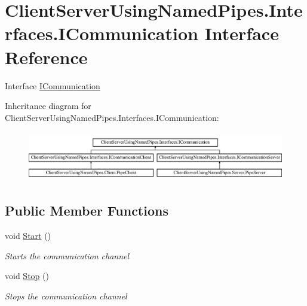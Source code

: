 \hypertarget{interface_client_server_using_named_pipes_1_1_interfaces_1_1_i_communication}{}\section{Client\+Server\+Using\+Named\+Pipes.\+Interfaces.\+I\+Communication Interface Reference}
\label{interface_client_server_using_named_pipes_1_1_interfaces_1_1_i_communication}


Interface \hyperlink{interface_client_server_using_named_pipes_1_1_interfaces_1_1_i_communication}{I\+Communication}  


Inheritance diagram for Client\+Server\+Using\+Named\+Pipes.\+Interfaces.\+I\+Communication\+:\begin{figure}[H]
\begin{center}
\leavevmode
\includegraphics[height=2.193212cm]{interface_client_server_using_named_pipes_1_1_interfaces_1_1_i_communication}
\end{center}
\end{figure}
\subsection*{Public Member Functions}
\begin{DoxyCompactItemize}
\item 
void \hyperlink{interface_client_server_using_named_pipes_1_1_interfaces_1_1_i_communication_ac06ad36a2b8a02d82e385e0eade28671}{Start} ()
\begin{DoxyCompactList}\small\item\em Starts the communication channel \end{DoxyCompactList}\item 
void \hyperlink{interface_client_server_using_named_pipes_1_1_interfaces_1_1_i_communication_a85ce939996cde20d398e799ca6a900f3}{Stop} ()
\begin{DoxyCompactList}\small\item\em Stops the communication channel \end{DoxyCompactList}\end{DoxyCompactItemize}


